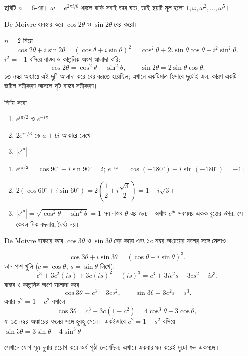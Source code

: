 \documentclass[11pt]{article}
\begin{document}
ছবিটি $n = 6$-এর। $\omega = e^{2\pi i/6}$ ধরলে বাকি সবাই তার ঘাত, তাই ছয়টি
মূল হলো $1, \omega, \omega^{2}, \dots, \omega^{5}$।

\begin{example}
De Moivre ব্যবহার করে $\cos 2\theta$ ও $\sin 2\theta$ বের করো।
\end{example}

\begin{solbox}
$n = 2$ নিয়ে
\[
  \cos 2\theta + i\sin 2\theta
  = \left( \cos\theta + i\sin\theta \right)^{2}
  = \cos^{2}\theta + 2i\sin\theta\cos\theta + i^{2}\sin^{2}\theta .
\]
$i^{2} = -1$ বসিয়ে বাস্তব ও কাল্পনিক অংশ আলাদা করি:
\[
  \cos 2\theta = \cos^{2}\theta - \sin^{2}\theta, \qquad
  \sin 2\theta = 2\sin\theta\cos\theta .
\]
১৩ নম্বর অধ্যায়ে এই দুটি আলাদা করে বের করতে হয়েছিল; এখানে একটিমাত্র
হিসাবে দুটোই এল, কারণ একটি জটিল সমীকরণ আসলে দুটি বাস্তব সমীকরণ।
\end{solbox}

 নির্ণয় করো।
\begin{enumerate}
  \item $e^{i\pi/2}$ ও $e^{-i\pi}$
  \item $2e^{i\pi/3}$-কে $a+bi$ আকারে লেখো
  \item $\left| e^{i\theta} \right|$
\end{enumerate}

\begin{sol}
\begin{enumerate}
  \item $e^{i\pi/2} = \cos 90^{\circ} + i\sin 90^{\circ} = i$;
        $e^{-i\pi} = \cos(-180^{\circ}) + i\sin(-180^{\circ}) = -1$।
  \item $2\left( \cos 60^{\circ} + i\sin 60^{\circ} \right)
        = 2\left( \dfrac{1}{2} + i\dfrac{\sqrt{3}}{2} \right)
        = 1 + i\sqrt{3}$।
  \item $\left| e^{i\theta} \right| = \sqrt{\cos^{2}\theta + \sin^{2}\theta}
        = 1$ সব বাস্তব $\theta$-এর জন্য। অর্থাৎ $e^{i\theta}$ সবসময় একক
        বৃত্তের উপর; সে কেবল দিক বদলায়, দৈর্ঘ্য নয়।
\end{enumerate}
\end{sol}

 De Moivre ব্যবহার করে $\cos 3\theta$ ও $\sin 3\theta$ বের করো এবং
১৩ নম্বর অধ্যায়ের ফলের সঙ্গে মেলাও।

\begin{sol}
\[
  \cos 3\theta + i\sin 3\theta
  = \left( \cos\theta + i\sin\theta \right)^{3} .
\]
ডান পাশ খুলি ($c = \cos\theta$, $s = \sin\theta$ লিখে):
\[
  c^{3} + 3c^{2}(is) + 3c(is)^{2} + (is)^{3}
  = c^{3} + 3ic^{2}s - 3cs^{2} - is^{3} .
\]
বাস্তব ও কাল্পনিক অংশ আলাদা করে
\[
  \cos 3\theta = c^{3} - 3cs^{2}, \qquad
  \sin 3\theta = 3c^{2}s - s^{3} .
\]
এবার $s^{2} = 1-c^{2}$ বসালে
\[
  \cos 3\theta = c^{3} - 3c\left( 1-c^{2} \right) = 4\cos^{3}\theta
  - 3\cos\theta ,
\]
যা ১৩ নম্বর অধ্যায়ের ফলের সঙ্গে হুবহু মেলে। একইভাবে $c^{2} = 1-s^{2}$
বসিয়ে $\sin 3\theta = 3\sin\theta - 4\sin^{3}\theta$।

সেখানে যোগ সূত্র দুবার প্রয়োগ করে অর্ধ পৃষ্ঠা লেগেছিল; এখানে একবার ঘন করেই
দুটো ফল একসঙ্গে।
\end{sol}
\end{document}
